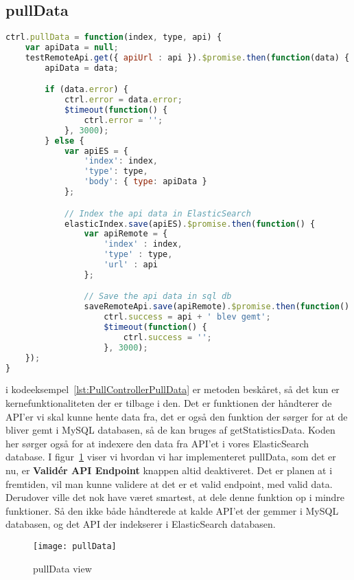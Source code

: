 \subsection{pullData}
\begin{lstlisting}[caption={pullData}, language={JavaScript}, label={lst:PullControllerPullData}]
ctrl.pullData = function(index, type, api) {
    var apiData = null;
    testRemoteApi.get({ apiUrl : api }).$promise.then(function(data) {
        apiData = data;

        if (data.error) {
            ctrl.error = data.error;
            $timeout(function() {
                ctrl.error = '';
            }, 3000);
        } else {
            var apiES = {
                'index': index,
                'type': type,
                'body': { type: apiData }
            };

            // Index the api data in ElasticSearch
            elasticIndex.save(apiES).$promise.then(function() {
                var apiRemote = {
                    'index' : index,
                    'type' : type,
                    'url' : api
                };

                // Save the api data in sql db
                saveRemoteApi.save(apiRemote).$promise.then(function() {
                    ctrl.success = api + ' blev gemt';
                    $timeout(function() {
                        ctrl.success = '';
                    }, 3000);
    });
}
\end{lstlisting}
i kodeeksempel~\ref{lst:PullControllerPullData} er metoden beskåret, så det kun er kernefunktionaliteten der er tilbage i den.
Det er funktionen der håndterer de API'er vi skal kunne hente data fra, det er også den funktion der sørger for at de bliver gemt 
i MySQL databasen, så de kan bruges af getStatisticsData. Koden her sørger også for at indexere den data fra API'et i vores ElasticSearch
database.
I figur~\ref{fig:pullData} viser vi hvordan vi har implementeret pullData, som det er nu, er \textbf{Validér API Endpoint} knappen altid deaktiveret. 
Det er planen at i fremtiden, vil man kunne validere at det er et valid endpoint, med valid data.
Derudover ville det nok have været smartest, at dele denne funktion op i mindre funktioner. Så den ikke både håndterede at kalde API'et der gemmer i MySQL databasen,
og det API der indekserer i ElasticSearch databasen.
\begin{figure}[H]
     \centering
     \texttt{[image: pullData]}
     \caption{pullData view}
     \label{fig:pullData}
\end{figure}
